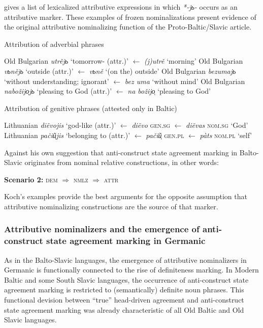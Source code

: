 \citet[467–468]{koch1999} gives a list of lexicalized attributive expressions in which \textit{*-jь-} occurs as an attributive marker. These examples of frozen nominalizations present evidence of the original attributive nominalizing function of the Proto-Baltic/Slavic article. 
\begin{exe}
\ex
\begin{xlist}
\ex Attribution of adverbial phrases
\begin{xlist}
\ex Old Bulgarian \textit{utrějь} ‘tomorrow- (attr.)’ $\leftarrow$ \textit{(j)utrě} ‘morning’
\ex Old Bulgarian \textit{vьnějь} ‘outside (attr.)’ $\leftarrow$ \textit{vьně} ‘(on the) outside’ Old Bulgarian \textit{bezumajь} ‘without understanding; ignorant’ $\leftarrow$ \textit{bez uma} ‘without mind’
\ex Old Bulgarian \textit{nabožijo̜jь} ‘pleasing to God (attr.)’ $\leftarrow$ \textit{na božijo̜} ‘pleasing to God’
\end{xlist}
\ex Attribution of genitive phrases (attested only in Baltic)
\begin{xlist}
\ex Lithuanian \textit{di\~evojis} ‘god-like (attr.)’ $\leftarrow$ \textit{di\~evo} \textsc{gen.sg} $\leftarrow$ \textit{di\~evas} \textsc{nom.sg} ‘God’
\ex Lithuanian \textit{pači\~u̜jis} ‘belonging to (attr.)’ $\leftarrow$ \textit{pači\~u̜} \textsc{gen.pl} $\leftarrow$ \textit{pàts} \textsc{nom.pl} ‘self’
\end{xlist}
\end{xlist}
\end{exe}%
Against his own suggestion that anti-construct state agreement marking in Balto-Slavic originates from nominal relative constructions, in other words:
\begin{exe}
\ex \textbf{Scenario 2:} \textsc{dem $\Rightarrow$ nmlz $\Rightarrow$ attr}
\end{exe}
Koch's examples provide the best arguments for the opposite assumption that attributive nominalizing constructions are the source of that marker.

\subsubsection[Germanic]{Attributive nominalizers and the emergence of anti-construct state agreement marking in Germanic} \label{germanic diachr}
As in the Balto-Slavic languages, the emergence of attributive nominalizers in Germanic is functionally connected to the rise of definiteness marking. In Modern Baltic and some South Slavic languages, the occurrence of anti-construct state agreement marking is restricted to (semantically) definite noun phrases. This functional devision between “true” head-driven agreement and anti-construct state agreement marking was already characteristic of all Old Baltic and Old Slavic languages. 


